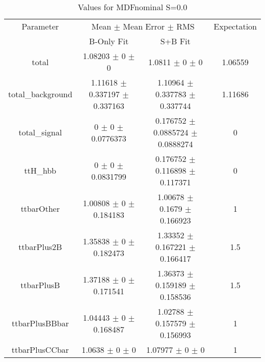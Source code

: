 \begin{table}
\centering
\caption{Values for MDFnominal S=0.0}
\begin{tabular}{cccc}
\toprule
Parameter & \multicolumn{2}{c}{Mean $\pm$ Mean Error $\pm$ RMS} & Expectation\\
 & B-Only Fit & S+B Fit & \\
\midrule
total & \num{1.08203} $\pm$ \num{0} $\pm$ \num{0} & \num{1.0811} $\pm$ \num{0} $\pm$ \num{0} & \num{1.06559}\\
total\_background & \num{1.11618} $\pm$ \num{0.337197} $\pm$ \num{0.337163} & \num{1.10964} $\pm$ \num{0.337783} $\pm$ \num{0.337744} & \num{1.11686}\\
total\_signal & \num{0} $\pm$ \num{0} $\pm$ \num{0.0776373} & \num{0.176752} $\pm$ \num{0.0885724} $\pm$ \num{0.0888274} & \num{0}\\
ttH\_hbb & \num{0} $\pm$ \num{0} $\pm$ \num{0.0831799} & \num{0.176752} $\pm$ \num{0.116898} $\pm$ \num{0.117371} & \num{0}\\
ttbarOther & \num{1.00808} $\pm$ \num{0} $\pm$ \num{0.184183} & \num{1.00678} $\pm$ \num{0.1679} $\pm$ \num{0.166923} & \num{1}\\
ttbarPlus2B & \num{1.35838} $\pm$ \num{0} $\pm$ \num{0.182473} & \num{1.33352} $\pm$ \num{0.167221} $\pm$ \num{0.166417} & \num{1.5}\\
ttbarPlusB & \num{1.37188} $\pm$ \num{0} $\pm$ \num{0.171541} & \num{1.36373} $\pm$ \num{0.159189} $\pm$ \num{0.158536} & \num{1.5}\\
ttbarPlusBBbar & \num{1.04443} $\pm$ \num{0} $\pm$ \num{0.168487} & \num{1.02788} $\pm$ \num{0.157579} $\pm$ \num{0.156993} & \num{1}\\
ttbarPlusCCbar & \num{1.0638} $\pm$ \num{0} $\pm$ \num{0} & \num{1.07977} $\pm$ \num{0} $\pm$ \num{0} & \num{1}\\
\bottomrule
\end{tabular}
\end{table}